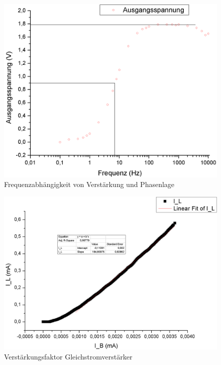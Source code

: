\documentclass[12pt,a4paper]{article}
\begin{document}
\begin{figure}[H]
	\centering
	\includegraphics[scale=0.45]{./data/frequenzabhaengigkeit.png}
	\caption{Frequenzabhängigkeit von Verstärkung und Phasenlage}
	\label{fig:frequenzabh}
\end{figure}

\begin{figure}[H]
	\centering
	\includegraphics[scale=0.45]{./data/stromverstaerkung.png}
	\caption{Verstärkungsfaktor Gleichstromverstärker}
	\label{fig:verstaerker_faktor}
\end{figure}
\end{document}
